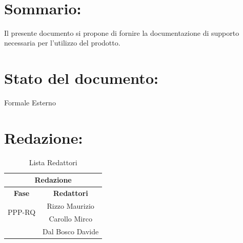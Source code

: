 \newpage
 
\begin{center} %
  \begin{Huge}  
        \textbf{\TITOLODOC}
      \\
  \end{Huge}
\end{center}
 
\section*{\LARGE Sommario:}
Il presente documento si propone di fornire la documentazione di supporto necessaria per l'utilizzo del prodotto.
 
\indent \indent
 
\section*{\LARGE Stato del documento:}
\indent \indent
  Formale Esterno
 
\section*{\LARGE Redazione:}
  \begin{table}[!h]
    \begin{center}
      \begin{tabular}
        {|c|c|}
        \hline
        \multicolumn{2}{|c|}{ \textbf{Redazione} } \\
        \hline
        \textbf{Fase} & \textbf{Redattori} \\
        \hline
        \multirow{2}{*}{PPP-RQ} & Rizzo Maurizio\\
                    & Carollo Mirco\\
                    & Dal Bosco Davide\\
        \hline
      \end{tabular}
      \caption{Lista Redattori} %
      \label{tabredazione}
    \end{center}
  \end{table}
  
